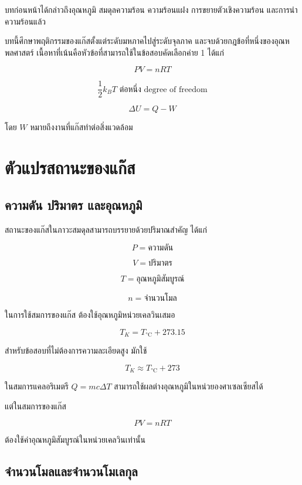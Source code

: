 \begin{tcolorbox}[title=ขอบเขตของบทนี้]
บทก่อนหน้าได้กล่าวถึงอุณหภูมิ สมดุลความร้อน ความร้อนแฝง การขยายตัวเชิงความร้อน และการนำความร้อนแล้ว

บทนี้ศึกษาพฤติกรรมของแก๊สตั้งแต่ระดับมหภาคไปสู่ระดับจุลภาค และจบด้วยกฎข้อที่หนึ่งของอุณหพลศาสตร์ เนื้อหาที่เน้นคือหัวข้อที่สามารถใช้ในข้อสอบคัดเลือกค่าย 1 ได้แก่

\[
PV=nRT
\]

\[
\frac{1}{2}k_BT \text{ ต่อหนึ่ง degree of freedom}
\]

\[
\Delta U=Q-W
\]

โดย $W$ หมายถึงงานที่แก๊สทำต่อสิ่งแวดล้อม
\end{tcolorbox}

\newpage{}

\section{ตัวแปรสถานะของแก๊ส}

\subsection{ความดัน ปริมาตร และอุณหภูมิ}

สถานะของแก๊สในภาวะสมดุลสามารถบรรยายด้วยปริมาณสำคัญ ได้แก่

\[
P=\text{ความดัน}
\]

\[
V=\text{ปริมาตร}
\]

\[
T=\text{อุณหภูมิสัมบูรณ์}
\]

\[
n=\text{จำนวนโมล}
\]

ในการใช้สมการของแก๊ส ต้องใช้อุณหภูมิหน่วยเคลวินเสมอ

\[
\boxed{T_{\si{K}}=T_{\si{\degreeCelsius}}+273.15}
\]

สำหรับข้อสอบที่ไม่ต้องการความละเอียดสูง มักใช้

\[
T_{\si{K}}\approx T_{\si{\degreeCelsius}}+273
\]

\begin{tcolorbox}[title=ข้อควรระวัง]
ในสมการแคลอริเมตรี $Q=mc\Delta T$ สามารถใช้ผลต่างอุณหภูมิในหน่วยองศาเซลเซียสได้

แต่ในสมการของแก๊ส

\[
PV=nRT
\]

ต้องใช้ค่าอุณหภูมิสัมบูรณ์ในหน่วยเคลวินเท่านั้น
\end{tcolorbox}

\subsection{จำนวนโมลและจำนวนโมเลกุล}

